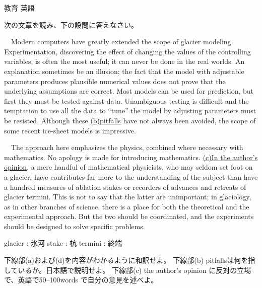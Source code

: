 \documentclass[fleqn]{jbook}
\begin{document}
\begin{question}{教育 英語}{}
\begin{subquestions}
\SubQuestion
  次の文章を読み、下の設問に答えなさい。
\baselineskip=12pt

  　Modern computers have greatly extended the scope of glacier
  modeling.  Experimentation, discovering the 
  effect of changing the values of the controlling variables, is
  often the most useful; it can never be done in the real worlds.
  An explanation sometimes be an illusion; the fact that the model 
  with adjustable parameters produces plausible numerical values 
  does not prove that the underlying assumptions are correct. Most 
  models can be used for prediction, but first they must be tested 
  against data. Unambiguous testing is difficult and the temptation
  to use all the data to ``tune'' the model by adjusting parameters
  must be resisted. Although these \underline{(b)pitfalls}
  have not always been avoided, the scope of some recent ice-sheet
  models is impressive.

  　The approach here emphasizes the physics, combined where necessary
  with mathematics. No apology is made for introducing mathematics.
  \underline{(c)In the author's opinion}, a mere handful of
  mathematical physicists, who may seldom set foot on a glacier, have
  contributes far more to the understanding of the subject than have a
  hundred measures of ablation stakes or recorders of advances and
  retreats of glacier termini. This is not to say that the latter are
  unimportant; in glaciology, as in other branches of science, there
  is a place for both the theoretical and the experimental approach.
  But the two should be coordinated, and the experiments should be
  designed to solve specific problems. 

  glacier : 氷河 \quad
  stake   : 杭   \quad
  termini : 終端
\baselineskip=15pt
  \begin{subsubquestions}
  \SubSubQuestion
    下線部(a)および(d)を内容がわかるように和訳せよ。
  \SubSubQuestion
    下線部(b) pitfallsは何を指しているか。日本語で説明せよ。
  \SubSubQuestion 
    下線部(c) the author's opinion に反対の立場で、英語で50--100words
    で自分の意見を述べよ。
  \end{subsubquestions}



\end{subquestions}
\end{question}
\end{document}
